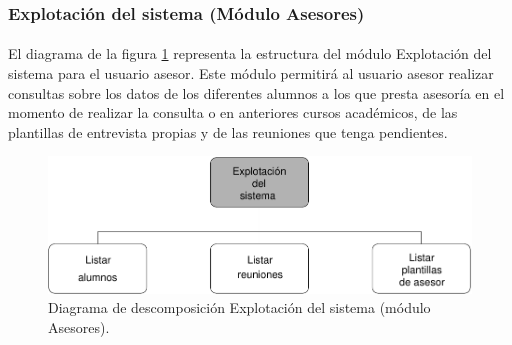 \subsubsection{Explotación del sistema (Módulo Asesores)}

  \paragraph{}El diagrama de la figura
  \ref{diagramaDescomposicionExplotacionSistema-asesores} representa la
  estructura del módulo Explotación del sistema para el usuario asesor. Este
  módulo permitirá al usuario asesor realizar consultas sobre los datos de los
  diferentes alumnos a los que presta asesoría en el momento de realizar la
  consulta o en anteriores cursos académicos, de las plantillas de entrevista
  propias y de las reuniones que tenga pendientes.

  \begin{figure}[!ht]
    \begin{center}
      \includegraphics[]{11.Disenyo_Arquitectonico/11.2.Diagramas_Descomposicion/11.2.4.Modulo_asesores/ExplotacionSistema/Diagramas/explotacion_sistema.pdf}
      \caption{Diagrama de descomposición Explotación del sistema (módulo Asesores).}
      \label{diagramaDescomposicionExplotacionSistema-asesores}
    \end{center}
  \end{figure}